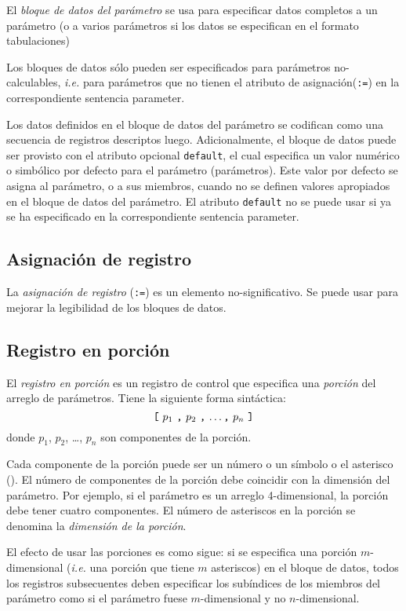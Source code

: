 \documentclass[11pt,spanish]{report}
\begin{document}
El {\it bloque de datos del parámetro} se usa para especificar datos completos a un parámetro (o a varios parámetros si los datos se especifican en el formato tabulaciones)

Los bloques de datos sólo pueden ser especificados para parámetros no-calculables, {\it i.e.} para parámetros que no tienen el atributo de asignación({\tt:=}) en la correspondiente sentencia parameter.

Los datos definidos en el bloque de datos del parámetro se codifican como una secuencia de registros descriptos luego. Adicionalmente, el bloque de datos puede ser provisto con el atributo opcional {\tt default}, el cual especifica un valor numérico o simbólico por defecto para el parámetro (parámetros). Este valor por defecto se asigna al parámetro, o a sus miembros, cuando no se definen valores apropiados en el bloque de datos del parámetro. El atributo {\tt default} no se puede usar si ya se ha especificado en la correspondiente sentencia parameter.

\subsection{Asignación de registro}

La {\it asignación de registro} ({\tt:=}) es un elemento no-significativo. Se puede usar para mejorar la legibilidad de los bloques de datos.

\subsection{Registro en porción}

El {\it registro en porción} es un registro de control que especifica una {\it porción} del arreglo de parámetros. Tiene la siguiente forma sintáctica:
$$\mbox{{\tt[} $p_1$ {\tt,} $p_2$ {\tt,} \dots {\tt,} $p_n$ {\tt]}}$$
donde $p_1$, $p_2$, \dots, $p_n$ son componentes de la porción.

Cada componente de la porción puede ser un número o un símbolo o el asterisco ({\tt*}). El número de componentes de la porción debe coincidir con la dimensión del parámetro. Por ejemplo, si el parámetro es un arreglo 4-dimensional, la porción debe tener cuatro componentes. El número de asteriscos en la porción se denomina la {\it dimensión de la porción}.

El efecto de usar las porciones es como sigue: si se especifica una porción $m$-dimensional ({\it i.e.} una porción que tiene $m$ asteriscos) en el bloque de datos, todos los registros subsecuentes deben especificar los subíndices de los miembros del parámetro como si el parámetro fuese $m$-dimensional y no $n$-dimensional.
\end{document}
